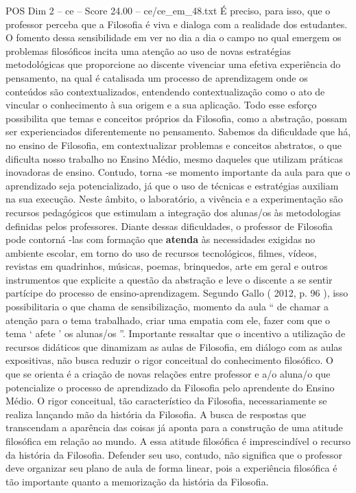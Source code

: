 \begin{textsample}{POS Dim 2 – ce – Score 24.00 – ce/ce\_em\_48.txt}
É preciso, para isso, que o professor perceba que a Filosofia é viva e dialoga com a realidade dos estudantes.
O fomento dessa sensibilidade em ver no dia a dia o campo no qual emergem os problemas filosóficos incita uma atenção ao uso de novas estratégias metodológicas que proporcione ao discente vivenciar uma efetiva experiência do pensamento, na qual é catalisada um processo de aprendizagem onde os conteúdos são contextualizados, entendendo contextualização como o ato de vincular o conhecimento à sua origem e a sua aplicação.
Todo esse esforço possibilita que temas e conceitos próprios da Filosofia, como a abstração, possam ser experienciados diferentemente no pensamento.
Sabemos da dificuldade que há, no ensino de Filosofia, em contextualizar problemas e conceitos abstratos, o que dificulta nosso trabalho no Ensino Médio, mesmo daqueles que utilizam práticas inovadoras de ensino.
Contudo, torna -se momento importante da aula para que o aprendizado seja potencializado, já que o uso de técnicas e estratégias auxiliam na sua execução.
Neste âmbito, o laboratório, a vivência e a experimentação são recursos pedagógicos que estimulam a integração dos alunas/os às metodologias definidas pelos professores.
Diante dessas dificuldades, o professor de Filosofia pode contorná -las com formação que \textbf{atenda} às necessidades exigidas no ambiente escolar, em torno do uso de recursos tecnológicos, filmes, vídeos, revistas em quadrinhos, músicas, poemas, brinquedos, arte em geral e outros instrumentos que explicite a questão da abstração e leve o discente a se sentir partícipe do processo de ensino-aprendizagem.
Segundo Gallo ( 2012, p. 96 ), isso possibilitaria o que chama de sensibilização, momento da aula “ de chamar a atenção para o tema trabalhado, criar uma empatia com ele, fazer com que o tema ‘ afete ’ os alunas/os ”.
Importante ressaltar que o incentivo a utilização de recursos didáticos que dinamizam as aulas de Filosofia, em diálogo com as aulas expositivas, não busca reduzir o rigor conceitual do conhecimento filosófico.
O que se orienta é a criação de novas relações entre professor e a/o aluna/o que potencialize o processo de aprendizado da Filosofia pelo aprendente do Ensino Médio.
O rigor conceitual, tão característico da Filosofia, necessariamente se realiza lançando mão da história da Filosofia.
A busca de respostas que transcendam a aparência das coisas já aponta para a construção de uma atitude filosófica em relação ao mundo.
A essa atitude filosófica é imprescindível o recurso da história da Filosofia.
Defender seu uso, contudo, não significa que o professor deve organizar seu plano de aula de forma linear, pois a experiência filosófica é tão importante quanto a memorização da história da Filosofia.

\end{textsample}

